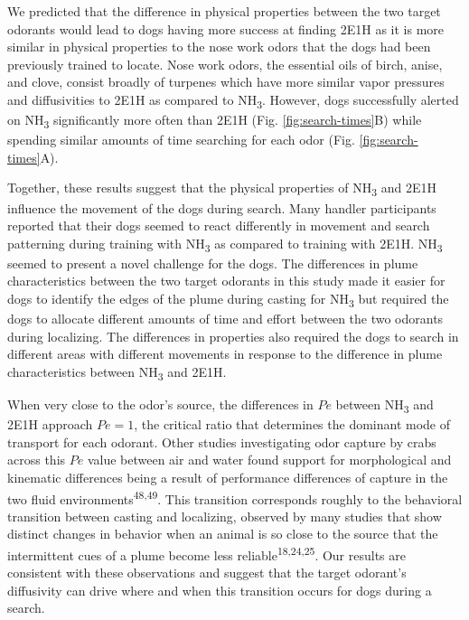 \documentclass[
]{article}
\begin{document}
We predicted that the difference in physical properties between the two target odorants would lead to dogs having more success at finding 2E1H as it is more similar in physical properties to the nose work odors that the dogs had been previously trained to locate. Nose work odors, the essential oils of birch, anise, and clove, consist broadly of turpenes which have more similar vapor pressures and diffusivities to 2E1H as compared to NH\textsubscript{3}. However, dogs successfully alerted on NH\textsubscript{3} significantly more often than 2E1H (Fig. \ref{fig:search-times}B) while spending similar amounts of time searching for each odor (Fig. \ref{fig:search-times}A).

Together, these results suggest that the physical properties of NH\textsubscript{3} and 2E1H influence the movement of the dogs during search. Many handler participants reported that their dogs seemed to react differently in movement and search patterning during training with NH\textsubscript{3} as compared to training with 2E1H. NH\textsubscript{3} seemed to present a novel challenge for the dogs. The differences in plume characteristics between the two target odorants in this study made it easier for dogs to identify the edges of the plume during casting for NH\textsubscript{3} but required the dogs to allocate different amounts of time and effort between the two odorants during localizing. The differences in properties also required the dogs to search in different areas with different movements in response to the difference in plume characteristics between NH\textsubscript{3} and 2E1H.

When very close to the odor's source, the differences in \(Pe\) between NH\textsubscript{3} and 2E1H approach \(Pe=1\), the critical ratio that determines the dominant mode of transport for each odorant. Other studies investigating odor capture by crabs across this \(Pe\) value between air and water found support for morphological and kinematic differences being a result of performance differences of capture in the two fluid environments\textsuperscript{48,49}. This transition corresponds roughly to the behavioral transition between casting and localizing, observed by many studies that show distinct changes in behavior when an animal is so close to the source that the intermittent cues of a plume become less reliable\textsuperscript{18,24,25}. Our results are consistent with these observations and suggest that the target odorant's diffusivity can drive where and when this transition occurs for dogs during a search.
\end{document}
